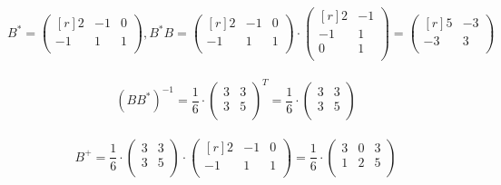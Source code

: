 \documentclass[12pt]{article}
\begin{document}
	\[B^* = \begin{pmatrix}[r]
	2 & -1 & 0 \\         
	-1 & 1 & 1 \\
	\end{pmatrix}, B^*B = \begin{pmatrix}[r]
	2 & -1 & 0 \\         
	-1 & 1 & 1 \\
	\end{pmatrix} \cdot \begin{pmatrix}[r]
	2 & -1 \\         
	-1 & 1 \\
	0 & 1 \\
	\end{pmatrix} = \begin{pmatrix}[r]
	5 & -3 \\         
	-3 & 3 \\
	\end{pmatrix}\]\\
	\[(BB^*)^{-1} = \frac{1}{6} \cdot \begin{pmatrix}
	3 & 3 \\         
	3 & 5 \\
	\end{pmatrix}^T = \frac{1}{6} \cdot \begin{pmatrix}
	3 & 3 \\         
	3 & 5 \\
	\end{pmatrix}\]\\
	\[B^+ = \frac{1}{6} \cdot \begin{pmatrix}
	3 & 3 \\         
	3 & 5 \\
	\end{pmatrix} \cdot \begin{pmatrix}[r]
	2 & -1 & 0 \\         
	-1 & 1 & 1 \\
	\end{pmatrix} = \frac{1}{6} \cdot \begin{pmatrix}
	3 & 0 & 3 \\         
	1 & 2 & 5 \\
	\end{pmatrix}\]\\
\end{document}
